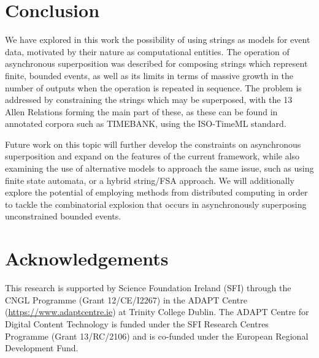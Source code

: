 \documentclass[a4paper,11pt,leqno]{article}
\begin{document}
\section{Conclusion}\label{conclusion}
We have explored in this work the possibility of using strings as models for 
event data, motivated by their nature as computational entities. The 
operation of asynchronous superposition was described for composing strings 
which represent finite, bounded events, as well as its limits in terms of 
massive growth in the number of outputs when the operation is repeated in 
sequence. The problem is addressed by 
constraining the strings which may be superposed, with the 13 
Allen Relations forming the main part of these, as these can be found in 
annotated corpora such as TIMEBANK, using the ISO-TimeML standard.

Future work on this topic will further develop the constraints on asynchronous 
superposition and expand on the features of the current framework, while also 
examining the use of alternative models to approach the same issue, such as 
using finite state automata, or a hybrid string/FSA approach. We will 
additionally explore the potential of employing methods from distributed 
computing in order to tackle the combinatorial explosion that occurs in 
asynchronously superposing unconstrained bounded events.
\section*{Acknowledgements}
This research is supported by Science Foundation Ireland (SFI) through the CNGL 
Programme (Grant 12/CE/I2267) in the ADAPT Centre 
(\url{https://www.adaptcentre.ie}) at Trinity College Dublin. The
ADAPT Centre for Digital Content Technology is funded under the SFI Research 
Centres Programme (Grant 13/RC/2106) and is co-funded under the European 
Regional Development Fund.

{}

\end{document}

